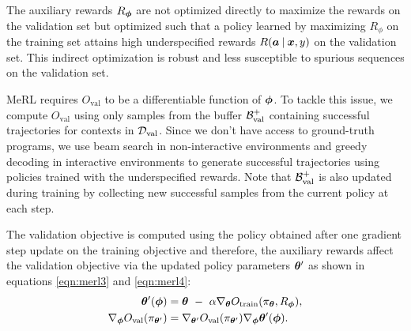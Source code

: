 The auxiliary rewards $R_{{\bm{\phi}}}$ are not optimized directly to maximize the rewards on the validation set but optimized such that a policy learned by maximizing $R_\phi$ on the training set attains high underspecified rewards $R({\bm{a}} \:\vert\: {\bm{x}}, y)$ on the validation set. This indirect optimization is robust and less susceptible to spurious sequences on the validation set.

MeRL requires $O_{\mathrm{val}}$ to be a differentiable function of ${\bm{\phi}}$. To tackle this issue, we compute $O_{\mathrm{val}}$ using only samples from the buffer $\mathcal{B}^+_{\mathrm{val}}$ containing successful trajectories for contexts in ${\mathcal{D}}_{\mathrm{val}}$. Since we don't have access to ground-truth programs, we use beam search in non-interactive environments and greedy decoding in interactive environments to generate successful trajectories using policies trained with the underspecified rewards. Note that $\mathcal{B}^+_{\mathrm{val}}$ is also updated during training by collecting new successful samples from the current policy at each step.

The validation objective is computed using the policy obtained after one gradient step update on the training objective and therefore, the auxiliary rewards affect the validation objective via the updated policy parameters ${\bm{\theta}}^{\prime}$ as shown in equations \eqref{eqn:merl3} and \eqref{eqn:merl4}:
\begin{align}
  {\bm{\theta}}^{\prime}({\bm{\phi}}) ={}& {\bm{\theta}} \ -\ \alpha \nabla_{{\bm{\theta}}} O_{\mathrm{train}}(\pi_{{\bm{\theta}}}, R_{{\bm{\phi}}})\label{eqn:merl3},\\
  \nabla_{{\bm{\phi}}} O_{\mathrm{val}}(\pi_{{\bm{\theta}}^{\prime}}) ={}& \nabla_{{\bm{\theta}}^{\prime}} O_{\mathrm{val}}(\pi_{{\bm{\theta}}^{\prime}}) \nabla_{{\bm{\phi}}} {\bm{\theta}}^{\prime}({\bm{\phi}})\label{eqn:merl4}
.
\end{align}

